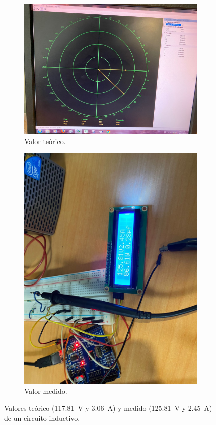 \begin{figure}[h]
    \centering
    \begin{subfigure}{0.45\textwidth}
        \includegraphics[width=\textwidth]{Imagenes/inductive.jpg}
        \caption{Valor teórico.}
    \end{subfigure}
    \begin{subfigure}{0.45\textwidth}
        \includegraphics[width=\textwidth]{Imagenes/inductive_2.jpg} 
        \caption{Valor medido.}
    \end{subfigure}
    \caption{Valores teórico (\SI{117.81}{\volt} y \SI{3.06}{\ampere}) y medido (\SI{125.81}{\volt}
    y \SI{2.45}{\ampere}) de un circuito inductivo.}
    \label{ind--}
\end{figure}

